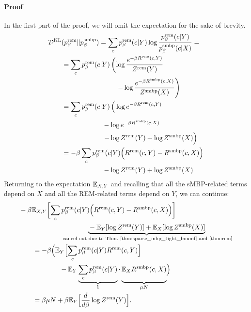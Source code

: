 \paragraph{Proof}
In the first part of the proof, we will omit the expectation for the sake of
brevity.
%
\begin{align}
\MoveEqLeft \KL(\prem_\beta \| \psmbp_\beta) = \sum_c \prem_\beta(c\vert Y) \log
  \frac{\prem_\beta(c\vert Y)}{\psmbp_\beta(c\vert X)} = \notag \\
  &= \sum_c \prem_\beta(c\vert Y) 
    \left(  
      \log \frac{e^{-\beta \Rrem(c,Y)}}{\Zrem(Y)} \right. \notag \\
      &\qquad\qquad\qquad\qquad
      \left. - \log \frac{e^{-\beta \Rsmbp(c,X)}}{\Zsmbp(X)}
    \right) \notag \\
  &=  \sum_c \prem_\beta(c\vert Y) 
    \left(  \vphantom{\sum}
      \log e^{-\beta \Rrem(c,Y)}   \right. \notag \\
      &\qquad\qquad\qquad - \log e^{-\beta \Rsmbp(c,X)} \notag \\
      &\qquad\qquad\qquad \left. - \log \Zrem(Y) + \log \Zsmbp(X)
      \vphantom{\sum}\right) \notag \\
  &= -\beta \sum_c \prem_\beta(c\vert Y) 
    \Bigl( \Rrem(c,Y) - \Rsmbp(c,X) \Bigr) \notag \\
      &\qquad\qquad\qquad  - \log \Zrem(Y) + \log \Zsmbp(X) 
\end{align}
Returning to the expectation $\mathbb{E}_{X,Y}$ and recalling that all the
sMBP-related terms depend on $X$ and all the REM-related terms depend on $Y$, we can continue:
\begin{align}
  \MoveEqLeft -\beta \Expct_{X,Y} \biggl[\sum_c \prem_\beta(c\vert Y) 
    \Bigl( \Rrem(c,Y) - \Rsmbp(c,X) \Bigr) \biggr] \notag \\
      &\qquad\qquad  
        \underbrace{
            {} - \Expct_Y [\log \Zrem(Y) ]
            + \Expct_X [\log \Zsmbp(X)]
          }_{
          \text{
            cancel out due to Thm.~\ref{thm:sparse_mbp_tight_bound} and \ref{thm:rem}}
          } \notag \\
  &= -\beta  
    \Bigl( \Expct_{Y} \Bigl[\sum_c \prem_\beta(c\vert Y) \Rrem(c,Y) \Bigr] \notag \\
        &\qquad\qquad - \Expct_Y 
          \underbrace{\sum_c \prem_\beta(c\vert Y)}_{1} \cdot 
          \underbrace{\vphantom{\sum_c}\Expct_X \Rsmbp(c,X)}_{\mu N} \Bigr) \notag \\
  &= \beta \mu N + \beta \Expct_Y \Bigl[\frac{d}{d\beta} \log \Zrem(Y)\Bigr].
\end{align}
